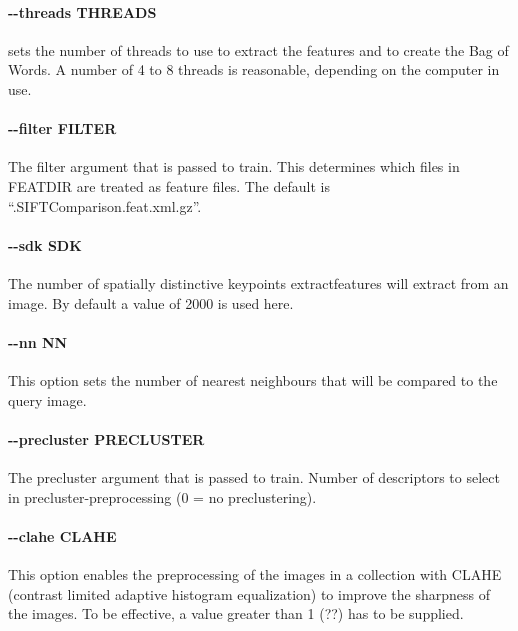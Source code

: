 \documentclass{hitec}
\begin{document}
\paragraph{\ttfamily -{}-threads THREADS}

sets the number of threads to use to extract the features and to create the Bag
of Words. A number of 4 to 8 threads is reasonable, depending on the computer in use.

\paragraph{\ttfamily -{}-filter FILTER}

The filter argument that is passed to {\ttfamily train}. This determines which files in
FEATDIR are treated as feature files. The default is ``.SIFTComparison.feat.xml.gz''.

\paragraph{\ttfamily -{}-sdk SDK}

The number of spatially distinctive keypoints {\ttfamily extractfeatures} will extract from
an image. By default a value of 2000 is used here.

\paragraph{\ttfamily -{}-nn NN}

This option sets the number of nearest neighbours that will be compared to the query
image. 

\paragraph{\ttfamily -{}-precluster PRECLUSTER}

The precluster argument that is passed to {\ttfamily train}.
Number of descriptors to select in precluster-preprocessing (0 = no preclustering).

\paragraph{\ttfamily -{}-clahe CLAHE}

This option enables the preprocessing of the images in a collection with CLAHE 
(contrast limited adaptive histogram equalization) to improve the sharpness
of the images. To be effective, a value greater than 1 (??) has to be supplied.
\end{document}
